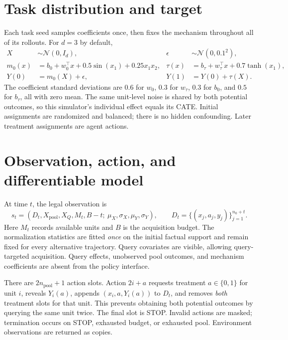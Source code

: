 \documentclass[10pt,a4paper]{article}
\begin{document}
\section{Task distribution and target}
Each task seed samples coefficients once, then fixes the mechanism throughout
all of its rollouts. For $d=3$ by default,
\begin{align}
 X&\sim\mathcal N(0,I_d), & \epsilon&\sim\mathcal N(0,0.1^2),\\[-0.3em]
 m_0(x)&=b_0+w_0^\top x+0.5\sin(x_1)+0.25x_1x_2,
 &\tau(x)&=b_\tau+w_\tau^\top x+0.7\tanh(x_1),\\[-0.3em]
 Y(0)&=m_0(X)+\epsilon, &Y(1)&=Y(0)+\tau(X).
\end{align}
The coefficient standard deviations are $0.6$ for $w_0$, $0.3$ for $w_\tau$,
$0.3$ for $b_0$, and $0.5$ for $b_\tau$, all with zero mean. The same unit-level
noise is shared by both potential outcomes, so this simulator's individual
effect equals its CATE. Initial assignments are randomized and balanced;
there is no hidden confounding. Later treatment assignments are agent actions.

\newpage
\section{Observation, action, and differentiable model}
At time $t$, the legal observation is
\[
 s_t=(D_t,X_{\mathrm{pool}},X_Q,M_t,B-t;\ \mu_X,\sigma_X,\mu_Y,\sigma_Y),
 \qquad D_t=\{(x_j,a_j,y_j)\}_{j=1}^{n_0+t}.
\]
Here $M_t$ records available units and $B$ is the acquisition budget. The
normalization statistics are fitted \emph{once} on the initial factual support
and remain fixed for every alternative trajectory. Query covariates are
visible, allowing query-targeted acquisition. Query effects, unobserved pool
outcomes, and mechanism coefficients are absent from the policy interface.

There are $2n_{\mathrm{pool}}+1$ action slots. Action $2i+a$ requests treatment
$a\in\{0,1\}$ for unit $i$, reveals $Y_i(a)$, appends $(x_i,a,Y_i(a))$ to $D_t$,
and removes \emph{both} treatment slots for that unit. This prevents obtaining
both potential outcomes by querying the same unit twice. The final slot is
STOP. Invalid actions are masked; termination occurs on STOP, exhausted budget,
or exhausted pool. Environment observations are returned as copies.
\end{document}
